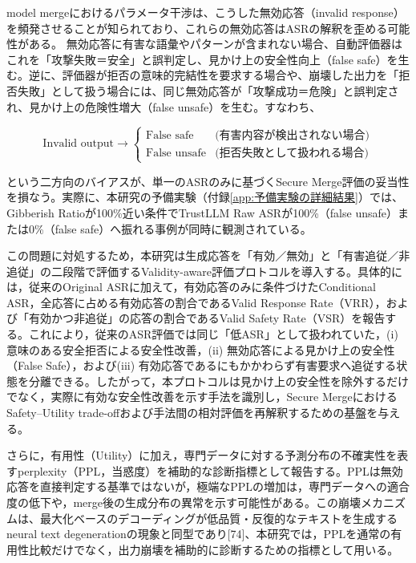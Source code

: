 \documentclass{article}
\begin{document}
model mergeにおけるパラメータ干渉は、こうした無効応答（invalid response）を頻発させることが知られており、これらの無効応答はASRの解釈を歪める可能性がある。
無効応答に有害な語彙やパターンが含まれない場合、自動評価器はこれを「攻撃失敗＝安全」と誤判定し、見かけ上の安全性向上（false safe）を生む。逆に、評価器が拒否の意味的完結性を要求する場合や、崩壊した出力を「拒否失敗」として扱う場合には、同じ無効応答が「攻撃成功＝危険」と誤判定され、見かけ上の危険性増大（false unsafe）を生む。すなわち、

\[
\text{Invalid output} \rightarrow
\begin{cases}
\text{False safe} & \text{(有害内容が検出されない場合)}\\
\text{False unsafe} & \text{(拒否失敗として扱われる場合)}
\end{cases}
\]

という二方向のバイアスが、単一のASRのみに基づくSecure Merge評価の妥当性を損なう。実際に、本研究の予備実験（付録\ref{app:予備実験の詳細結果}）では、Gibberish Ratioが100\%近い条件でTrustLLM Raw ASRが100\%（false unsafe）または0\%（false safe）へ振れる事例が同時に観測されている。


この問題に対処するため，本研究は生成応答を「有効／無効」と「有害追従／非追従」の二段階で評価するValidity-aware評価プロトコルを導入する。具体的には，従来のOriginal ASRに加えて，有効応答のみに条件づけたConditional ASR，全応答に占める有効応答の割合であるValid Response Rate（VRR），および「有効かつ非追従」の応答の割合であるValid Safety Rate（VSR）を報告する。これにより，従来のASR評価では同じ「低ASR」として扱われていた，(i) 意味のある安全拒否による安全性改善，(ii) 無効応答による見かけ上の安全性（False Safe），および(iii) 有効応答であるにもかかわらず有害要求へ追従する状態を分離できる。したがって，本プロトコルは見かけ上の安全性を除外するだけでなく，実際に有効な安全性改善を示す手法を識別し，Secure MergeにおけるSafety--Utility trade-offおよび手法間の相対評価を再解釈するための基盤を与える。

さらに，有用性（Utility）に加え，専門データに対する予測分布の不確実性を表すperplexity（PPL，当惑度）を補助的な診断指標として報告する。PPLは無効応答を直接判定する基準ではないが，極端なPPLの増加は，専門データへの適合度の低下や，merge後の生成分布の異常を示す可能性がある。この崩壊メカニズムは、最大化ベースのデコーディングが低品質・反復的なテキストを生成するneural text degenerationの現象と同型であり[74]、本研究では，PPLを通常の有用性比較だけでなく，出力崩壊を補助的に診断するための指標として用いる。
\end{document}
